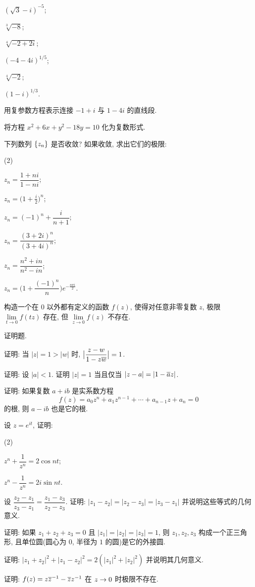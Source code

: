 \begin{homework}
\begin{exlist}
\begin{tasksexer}
      \item $(\sqrt3-i)^{-5}$;
      \item $\sqrt[3]{-8}$;
      \item $\sqrt[4]{-2+2i}$;
      \item $(-4-4i)^{1/5}$;
      \item $\sqrt[4]{-2}$;
      \item $(1-i)^{1/3}$.
    \end{tasksexer}
    \item 用复参数方程表示连接 $-1+i$ 与 $1-4i$ 的直线段.
    \item 将方程 $x^2+6x+y^2-18y=10$ 化为复数形式.
    \item 下列数列 ${\left\{z_n\right\}}$ 是否收敛? 如果收敛, 求出它们的极限:
    \begin{tasksexer}(2)
      \item $z_n=\dfrac{1+ni}{1-ni}$;
      \item $\displaystyle z_n=\bigl(1+\frac i2\bigr)^n$;
      \item $z_n=(-1)^n+\dfrac{i}{n+1}$;
      \item $z_n=\dfrac{(3+2i)^n}{(3+4i)^n}$;
      \item $z_n=\dfrac{n^2+in}{n^2-in}$;
      \item $z_n=\bigl(1+\dfrac{(-1)^n}n\bigr)e^{-\frac{n\pi i}2}$.
    \end{tasksexer}
    \item 构造一个在 $0$ 以外都有定义的函数 $f(z)$, 使得对任意非零复数 $z$, 极限 $\lim\limits_{t\to0}f(tz)$ 存在, 但 $\lim\limits_{z\to0}f(z)$ 不存在.
  \end{exlist}
  \item 证明题.
  \begin{exlist}
    \item 证明: 当 $|z|=1>|w|$ 时, $\bigl|\dfrac{z-w}{1-z\overline w}\bigr|=1$.
    \item 证明: 设 $|a|<1$. 证明 $|z|=1$ 当且仅当 $|z-a|=|1-\overline az|$.
    \item 证明: 如果复数 $a+ib$ 是实系数方程
      \[f(z)=a_0z^n+a_1z^{n-1}+\cdots+a_{n-1}z+a_n=0\]
      的根, 则 $a-ib$ 也是它的根.
    \item 设 $z=e^{it}$, 证明:\begin{tasksexam}(2)
      \item $z^n+\dfrac1{z^n}=2\cos{nt}$;
      \item $z^n-\dfrac1{z^n}=2i\sin{nt}$.
    \end{tasksexam}
    \item 设 $\dfrac{z_2-z_1}{z_3-z_1}=\dfrac{z_1-z_3}{z_2-z_3}$. 证明: $|z_1-z_2|=|z_2-z_3|=|z_3-z_1|$ 并说明这些等式的几何意义.
    \item 证明: 如果 $z_1+z_2+z_3=0$ 且 $|z_1|=|z_2|=|z_3|=1$, 则 $z_1,z_2,z_3$ 构成一个正三角形, 且单位圆(圆心为 $0$, 半径为 $1$ 的圆)是它的外接圆.
    \item 证明: $|z_1+z_2|^2+|z_1-z_2|^2=2(|z_1|^2+|z_2|^2)$ 并说明其几何意义.
    \item 证明: $f(z)=z{\overline z}^{-1}-\overline zz^{-1}$ 在 $z\rightarrow 0$ 时极限不存在.
  \end{exlist}
\end{homework}




